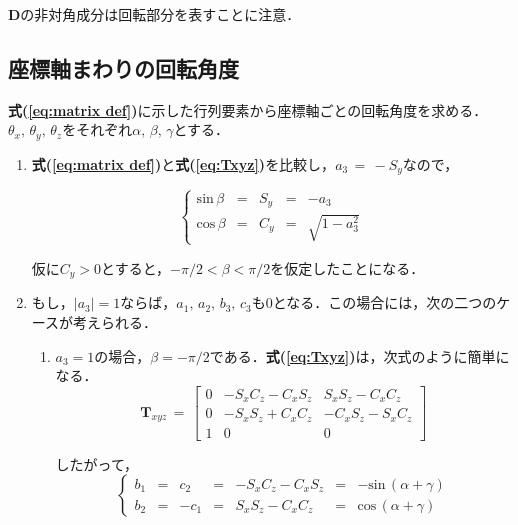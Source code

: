 \noindent $\bm D$の非対角成分は回転部分を表すことに注意．

%
\subsection{座標軸まわりの回転角度}
\textbf{式(\ref{eq:matrix def})}に示した行列要素から座標軸ごとの回転角度を求める．
$\theta_x,\,\theta_y,\,\theta_z$をそれぞれ$\alpha,\,\beta,\,\gamma$とする．

\begin{enumerate}
\item \textbf{式(\ref{eq:matrix def})}と\textbf{式(\ref{eq:Txyz})}を比較し，$a_3\,=\,-S_y$なので，

\begin{equation}
\left\{
\begin{array}{lllll}
\mathrm{sin}\,\beta & = & S_y & = & -a_3\\
\mathrm{cos}\,\beta & = & C_y & = & \sqrt{1-a_3^2}
\end{array}
\right.
\label{eq:angle 1}
\end{equation}

仮に$C_y>0$とすると，$-\pi/2<\beta<\pi/2$を仮定したことになる．
\vspace{2mm}

\item もし，$|a_3|=1$ならば，$a_1,\,a_2,\,b_3,\,c_3$も0となる．この場合には，次の二つのケースが考えられる．

\begin{enumerate}
\item $a_3=1$の場合，$\beta=-\pi/2$である．\textbf{式(\ref{eq:Txyz})}は，次式のように簡単になる．
\begin{equation}
{\bm T}_{xyz} \,=\,
\left[
\begin{array}{ccc}
0 & -S_x C_z - C_x S_z & S_x S_z - C_x C_z\\
0 & -S_x S_z + C_x C_z & -C_x S_z - S_x C_z\\
1 & 0 & 0
\end{array}
\right]
\label{eq:Txyz=1}
\end{equation}

したがって，
\begin{equation}
\left\{
\begin{array}{lllllll}
b_1 & = & c_2  & = & -S_x C_z - C_x S_z & = & -\mathrm{sin}\,(\alpha+\gamma)\\
b_2 & = & -c_1 & = & S_x S_z - C_x C_z  & = &  \mathrm{cos}\,(\alpha+\gamma)
\end{array}
\right.
\label{eq:angle 2}
\end{equation}
\vspace{2mm}


\end{enumerate}
\end{enumerate}
